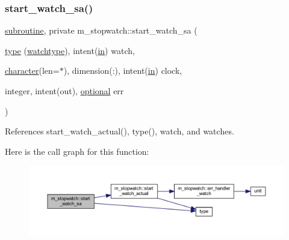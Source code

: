 \subsubsection{\texorpdfstring{start\+\_\+watch\+\_\+sa()}{start\_watch\_sa()}}
{\footnotesize\ttfamily \hyperlink{M__stopwatch_83_8txt_acfbcff50169d691ff02d4a123ed70482}{subroutine}, private m\+\_\+stopwatch\+::start\+\_\+watch\+\_\+sa (\begin{DoxyParamCaption}\item[{\hyperlink{stop__watch_83_8txt_a70f0ead91c32e25323c03265aa302c1c}{type} (\hyperlink{structm__stopwatch_1_1watchtype}{watchtype}), intent(\hyperlink{M__journal_83_8txt_afce72651d1eed785a2132bee863b2f38}{in})}]{watch,  }\item[{\hyperlink{option__stopwatch_83_8txt_abd4b21fbbd175834027b5224bfe97e66}{character}(len=$\ast$), dimension(\+:), intent(\hyperlink{M__journal_83_8txt_afce72651d1eed785a2132bee863b2f38}{in})}]{clock,  }\item[{integer, intent(out), \hyperlink{option__stopwatch_83_8txt_aa4ece75e7acf58a4843f70fe18c3ade5}{optional}}]{err }\end{DoxyParamCaption})\hspace{0.3cm}{\ttfamily [private]}}



References start\+\_\+watch\+\_\+actual(), type(), watch, and watches.

Here is the call graph for this function\+:
\nopagebreak
\begin{figure}[H]
\begin{center}
\leavevmode
\includegraphics[width=350pt]{namespacem__stopwatch_a4bd2594f2e02c3b97ff6f0556477b720_cgraph}
\end{center}
\end{figure}
\mbox{\label{namespacem__stopwatch_a8be3c59cc9a0333ebe966ae718d1d856}} 
